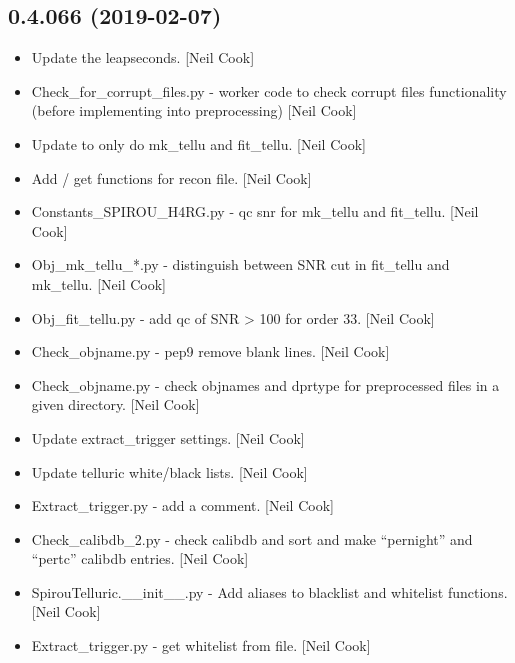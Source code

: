 \documentclass[a4paper,10pt,english]{report}
\begin{document}
\subsection{0.4.066 (2019-02-07)}
\label{\detokenize{misc/changelog:id190}}\begin{itemize}
\item {} 
Update the leapseconds. {[}Neil Cook{]}

\item {} 
Check\_for\_corrupt\_files.py - worker code to check corrupt files
functionality (before implementing into preprocessing) {[}Neil Cook{]}

\item {} 
Update to only do mk\_tellu and fit\_tellu. {[}Neil Cook{]}

\item {} 
Add  / get functions for recon file. {[}Neil Cook{]}

\item {} 
Constants\_SPIROU\_H4RG.py - qc snr for mk\_tellu and fit\_tellu. {[}Neil
Cook{]}

\item {} 
Obj\_mk\_tellu\_*.py - distinguish between SNR cut in fit\_tellu and
mk\_tellu. {[}Neil Cook{]}

\item {} 
Obj\_fit\_tellu.py - add qc of SNR \textgreater{} 100 for order 33. {[}Neil Cook{]}

\item {} 
Check\_objname.py - pep9 remove blank lines. {[}Neil Cook{]}

\item {} 
Check\_objname.py - check objnames and dprtype for preprocessed files
in a given directory. {[}Neil Cook{]}

\item {} 
Update extract\_trigger settings. {[}Neil Cook{]}

\item {} 
Update telluric white/black lists. {[}Neil Cook{]}

\item {} 
Extract\_trigger.py - add a comment. {[}Neil Cook{]}

\item {} 
Check\_calibdb\_2.py - check calibdb and sort and make “pernight” and
“pertc” calibdb entries. {[}Neil Cook{]}

\item {} 
SpirouTelluric.\_\_init\_\_.py - Add aliases to blacklist and whitelist
functions. {[}Neil Cook{]}

\item {} 
Extract\_trigger.py - get whitelist from file. {[}Neil Cook{]}

\end{itemize}
\end{document}
